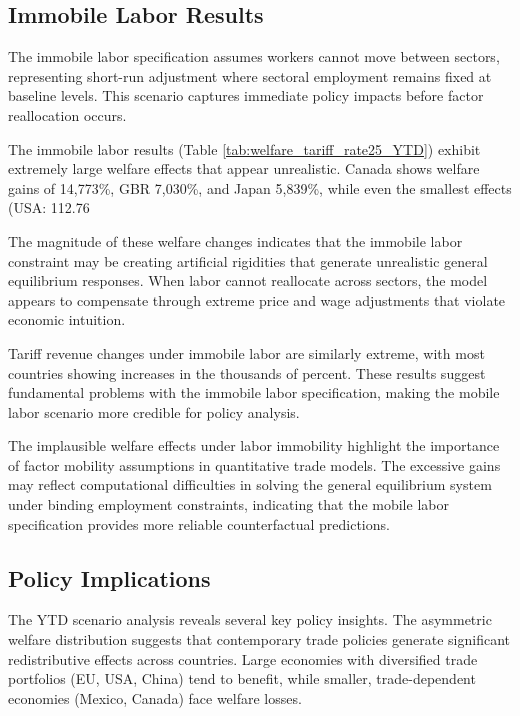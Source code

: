 \subsection{Immobile Labor Results}

The immobile labor specification assumes workers cannot move between sectors, representing short-run adjustment where sectoral employment remains fixed at baseline levels. This scenario captures immediate policy impacts before factor reallocation occurs.

The immobile labor results (Table \ref{tab:welfare_tariff_rate25_YTD}) exhibit extremely large welfare effects that appear unrealistic. Canada shows welfare gains of 14,773\%, GBR 7,030\%, and Japan 5,839\%, while even the smallest effects (USA: 112.76%

The magnitude of these welfare changes indicates that the immobile labor constraint may be creating artificial rigidities that generate unrealistic general equilibrium responses. When labor cannot reallocate across sectors, the model appears to compensate through extreme price and wage adjustments that violate economic intuition.

Tariff revenue changes under immobile labor are similarly extreme, with most countries showing increases in the thousands of percent. These results suggest fundamental problems with the immobile labor specification, making the mobile labor scenario more credible for policy analysis.

The implausible welfare effects under labor immobility highlight the importance of factor mobility assumptions in quantitative trade models. The excessive gains may reflect computational difficulties in solving the general equilibrium system under binding employment constraints, indicating that the mobile labor specification provides more reliable counterfactual predictions.

\subsection{Policy Implications}

The YTD scenario analysis reveals several key policy insights. The asymmetric welfare distribution suggests that contemporary trade policies generate significant redistributive effects across countries. Large economies with diversified trade portfolios (EU, USA, China) tend to benefit, while smaller, trade-dependent economies (Mexico, Canada) face welfare losses.

